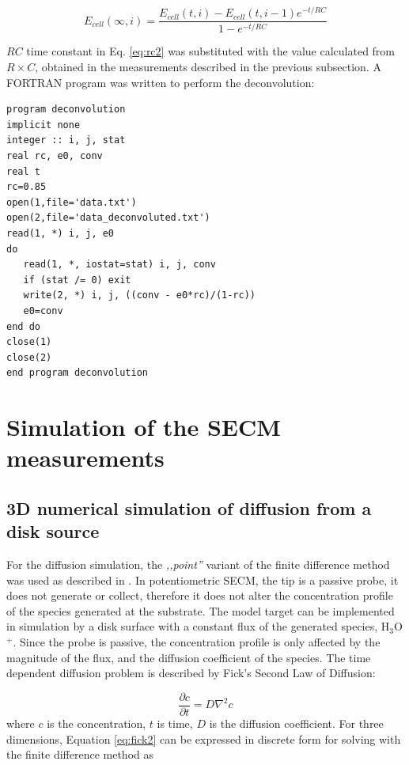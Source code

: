 \begin{equation}
\label{eq:rc3}
        E_{cell}(\infty, i)
        =
        \frac
                {E_{cell}(t, i) - E_{cell}(t, i-1)e^{-t/RC}}
                {1 - e^{-t/RC}}
\end{equation}

$RC$ time constant in Eq. \ref{eq:rc2} was substituted with the value calculated from $R\times C$, obtained in the measurements described in the previous subsection.
A FORTRAN program was written to perform the deconvolution:

\begin{lstlisting}
program deconvolution
implicit none
integer :: i, j, stat
real rc, e0, conv
real t
rc=0.85
open(1,file='data.txt')
open(2,file='data_deconvoluted.txt')
read(1, *) i, j, e0
do
   read(1, *, iostat=stat) i, j, conv
   if (stat /= 0) exit
   write(2, *) i, j, ((conv - e0*rc)/(1-rc))
   e0=conv
end do
close(1)
close(2)
end program deconvolution
\end{lstlisting}

	
	\section{Simulation of the SECM measurements}
		\subsection{3D numerical simulation of diffusion from a disk source}
For the diffusion simulation, the \emph{,,point''} variant of the finite difference method was used as described in \cite{britzdigital}.
In potentiometric SECM, the tip is a passive probe, it does not generate or collect, therefore it does not alter the concentration profile of the species generated at the substrate.
The model target can be implemented in simulation by a disk surface with a constant flux of the generated species, H$_3$O$^{+}$.
Since the probe is passive, the concentration profile is only affected by the magnitude of the flux, and the diffusion coefficient of the species.
The time dependent diffusion problem is described by Fick's Second Law of Diffusion:

\begin{equation}
\label{eq:fick2}
        \frac
                {\partial c}
                {\partial t}
                =
                D
                \nabla^2c
\end{equation}
where $c$ is the concentration, $t$ is time, $D$ is the diffusion coefficient.
For three dimensions, Equation \ref{eq:fick2} can be expressed in discrete form for solving with the finite difference method as

